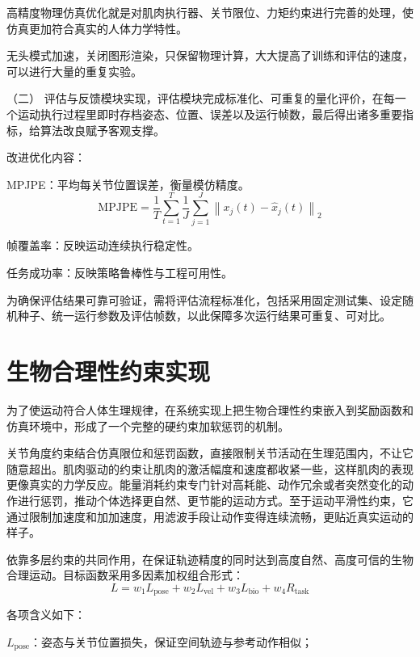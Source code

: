 高精度物理仿真优化就是对肌肉执行器、关节限位、力矩约束进行完善的处理，使仿真更加符合真实的人体力学特性。

无头模式加速，关闭图形渲染，只保留物理计算，大大提高了训练和评估的速度，可以进行大量的重复实验。

（二）
评估与反馈模块实现，评估模块完成标准化、可重复的量化评价，在每一个运动执行过程里即时存档姿态、位置、误差以及运行帧数，最后得出诸多重要指标，给算法改良赋予客观支撑。

改进优化内容：

MPJPE：平均每关节位置误差，衡量模仿精度。
\begin{equation}
\mathrm{MPJPE}=\frac{1}{T}\sum_{t=1}^{T}\frac{1}{J}\sum_{j=1}^{J}\left\|x_j(t)-\widehat{x}_j(t)\right\|_2
\tag{4-1}
\end{equation}

帧覆盖率：反映运动连续执行稳定性。

任务成功率：反映策略鲁棒性与工程可用性。

为确保评估结果可靠可验证，需将评估流程标准化，包括采用固定测试集、设定随机种子、统一运行参数及评估帧数，以此保障多次运行结果可重复、可对比。

\section{生物合理性约束实现}\label{ux751fux7269ux5408ux7406ux6027ux7ea6ux675fux5b9eux73b0}

为了使运动符合人体生理规律，在系统实现上把生物合理性约束嵌入到奖励函数和仿真环境中，形成了一个完整的硬约束加软惩罚的机制。

关节角度约束结合仿真限位和惩罚函数，直接限制关节活动在生理范围内，不让它随意超出。肌肉驱动的约束让肌肉的激活幅度和速度都收紧一些，这样肌肉的表现更像真实的力学反应。能量消耗约束专门针对高耗能、动作冗余或者突然变化的动作进行惩罚，推动个体选择更自然、更节能的运动方式。至于运动平滑性约束，它通过限制加速度和加加速度，用滤波手段让动作变得连续流畅，更贴近真实运动的样子。

依靠多层约束的共同作用，在保证轨迹精度的同时达到高度自然、高度可信的生物合理运动。目标函数采用多因素加权组合形式：\\
\begin{equation}
L=w_1L_{\mathrm{pose}}+w_2L_{\mathrm{vel}}+w_3L_{\mathrm{bio}}+w_4R_{\mathrm{task}}
\tag{4-2}
\end{equation}

各项含义如下：

\(L_{\mathrm{pose}}\)：姿态与关节位置损失，保证空间轨迹与参考动作相似；

